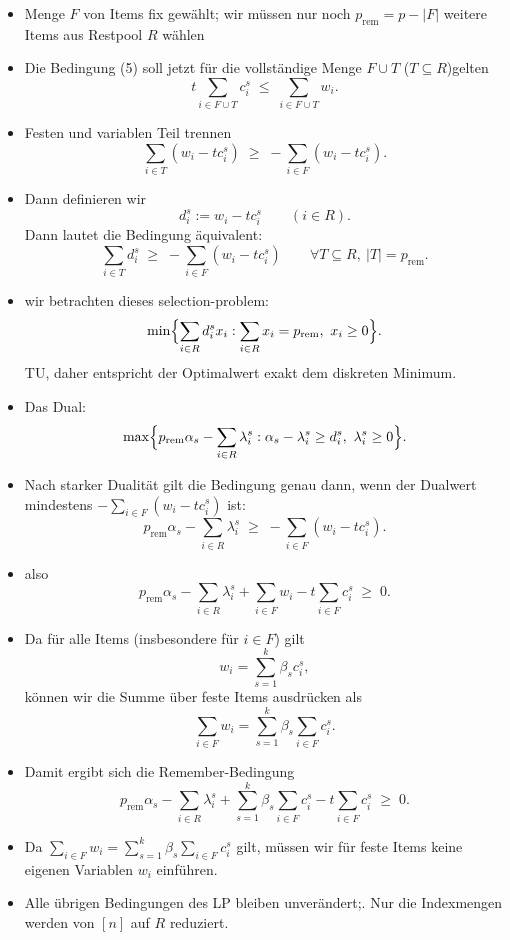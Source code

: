 \documentclass[abstracton]{scrartcl}
\begin{document}
\begin{itemize}
	\item Menge $F$ von Items fix gewählt; wir müssen nur noch
	$p_{\mathrm{rem}} = p - |F|$ weitere Items aus  Restpool $R$ wählen
	
	\item Die Bedingung (5) soll jetzt für die vollständige Menge 
	$F \cup T$ ($T \subseteq R$)gelten
	\[
	t \sum_{i\in F\cup T} c_i^s \;\le\; \sum_{i\in F\cup T} w_i.
	\]
	
	\item Festen und variablen Teil trennen
	\[
	\sum_{i\in T} (w_i - t c_i^s)
	\;\ge\;
	- \sum_{i\in F} (w_i - t c_i^s).
	\]
	
	\item Dann definieren wir
	\[
	d_i^s := w_i - t c_i^s \qquad (i\in R).
	\]
	Dann lautet die Bedingung äquivalent:
	\[
	\sum_{i\in T} d_i^s \;\ge\; 
	 - \sum_{i\in F}(w_i - t c_i^s)
	\qquad\forall T\subseteq R,\ |T| = p_{\mathrm{rem}}.
	\]
	
	\item wir betrachten dieses selection-problem:
	\[
	\min\Bigl\{\sum_{i\in R} d_i^s x_i : 
	\sum_{i\in R} x_i = p_{\mathrm{rem}},\ x_i\ge 0 \Bigr\}.
	\]
	TU, daher entspricht der Optimalwert exakt
	dem diskreten Minimum.
	
	\item Das Dual:
	\[
	\max\Bigl\{
	p_{\mathrm{rem}}\alpha_s - \sum_{i\in R} \lambda_i^s :
	\alpha_s - \lambda_i^s \ge d_i^s,\ \lambda_i^s\ge 0
	\Bigr\}.
	\]
	
	\item Nach starker Dualität gilt die Bedingung genau dann, wenn
	der Dualwert mindestens $- \sum_{i\in F}(w_i - t c_i^s)$ ist:
	\[
	p_{\mathrm{rem}}\alpha_s - \sum_{i\in R} \lambda_i^s \;\ge\; - \sum_{i\in F}(w_i - t c_i^s).
	\]
	
	\item also
	\[
	p_{\mathrm{rem}}\alpha_s - \sum_{i\in R} \lambda_i^s
	+ \sum_{i\in F} w_i - t \sum_{i\in F} c_i^s \;\ge\; 0.
	\]
	
	\item Da für alle Items (insbesondere für $i\in F$) gilt
	\[
	w_i = \sum_{s=1}^k \beta_s c_i^s,
	\]
	können wir die Summe über feste Items ausdrücken als
	\[
	\sum_{i\in F} w_i
	= \sum_{s=1}^k \beta_s \sum_{i\in F} c_i^s.
	\]
	
	\item Damit ergibt sich die Remember-Bedingung
	\[
	p_{\mathrm{rem}} \alpha_s
	- \sum_{i\in R} \lambda_i^s
	+ \sum_{s=1}^k \beta_s \sum_{i\in F} c_i^s
	- t \sum_{i\in F} c_i^s
	\;\ge\; 0.
	\]
	
	\item Da $\sum_{i\in F} w_i = \sum_{s=1}^k \beta_s \sum_{i\in F} c_i^s$
	gilt, müssen wir für feste Items keine eigenen Variablen $w_i$ einführen.
	
	\item Alle übrigen Bedingungen des LP bleiben unverändert;. Nur die Indexmengen werden von $[n]$ auf $R$ reduziert.
\end{itemize}
\end{document}
